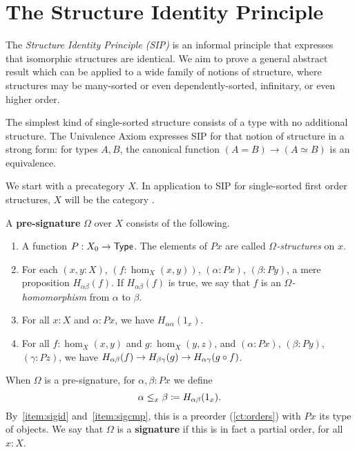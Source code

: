 \section{The Structure Identity Principle}
\label{sec:sip}

The \emph{Structure Identity Principle (SIP)} is an informal principle
that expresses that isomorphic structures are identical.  We aim to
prove a general abstract result which can be applied to a wide family
of notions of structure, where structures may be many-sorted or even
dependently-sorted, infinitary, or even higher order.

The simplest kind of single-sorted structure consists of a type with
no additional structure.  The Univalence Axiom expresses SIP for that
notion of structure in a strong form: for types $A,B$, the
canonical function $(A=B)\to (A\simeq B)$ is an equivalence.

We start with a precategory $X$.  In application to SIP for
single-sorted first order structures, $X$ will be the category \uset.

\begin{defn}\label{ct:sig}
  A \textbf{pre-signature} $\Omega$ over $X$ consists of the following.
  \begin{enumerate}
  \item A function $P:X_0 \to \mathsf{Type}$.
    The elements of $Px$ are called \emph{$\Omega$-structures} on $x$.
  \item For each $(x,y:X)$, $(f:\hom_X(x,y))$, $(\alpha:Px)$, $(\beta:Py)$, a mere proposition $H_{\alpha\beta}(f)$.
    If $H_{\alpha\beta}(f)$ is true, we say that $f$ is an \emph{$\Omega$-homomorphism} from $\alpha$ to $\beta$.
  \item For all $x:X$ and $\alpha:Px$, we have $H_{\alpha\alpha}(1_x)$.\label{item:sigid}
  \item For all $f:\hom_X(x,y)$ and $g:\hom_X(y,z)$, and $(\alpha:Px)$, $(\beta:Py)$, $(\gamma:Pz)$, we have $H_{\alpha\beta}(f)\to H_{\beta\gamma}(g)\rightarrow H_{\alpha\gamma}(g\circ f)$.\label{item:sigcmp}
  \end{enumerate}
  When $\Omega$ is a pre-signature, for $\alpha,\beta:Px$ we define
  \[ \alpha\leq_x\beta \coloneqq H_{\alpha\beta}(1_x).\]
  By~\ref{item:sigid} and~\ref{item:sigcmp}, this is a preorder (\autoref{ct:orders}) with $Px$ its type of objects.
  We say that $\Omega$ is a \textbf{signature} if this is in fact a partial order, for all $x:X$.
\end{defn}

